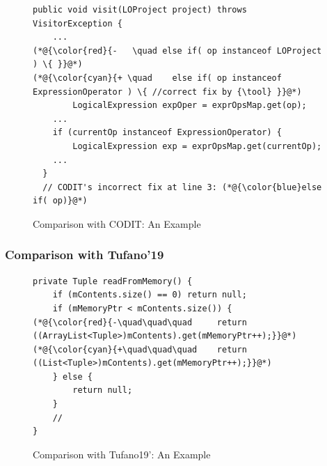 
\begin{figure}[t]
	\centering
	\begin{lstlisting}[]
public void visit(LOProject project) throws VisitorException {
    ...
(*@{\color{red}{-	\quad else if( op instanceof LOProject ) \{ }}@*)
(*@{\color{cyan}{+ \quad	else if( op instanceof ExpressionOperator ) \{ //correct fix by {\tool} }}@*)
		LogicalExpression expOper = exprOpsMap.get(op);
	...
	if (currentOp instanceof ExpressionOperator) {
		LogicalExpression exp = exprOpsMap.get(currentOp);
	...
  }
  // CODIT's incorrect fix at line 3: (*@{\color{blue}else if( op)}@*) 
	\end{lstlisting}
        \vspace{-17pt}
	\caption{Comparison with CODIT: An Example}
	\label{example_codit}
\end{figure}

\subsubsection{\bf Comparison with Tufano'19}



\begin{figure}[t]
	\centering
	\begin{lstlisting}[]
private Tuple readFromMemory() {
    if (mContents.size() == 0) return null;
    if (mMemoryPtr < mContents.size()) {
(*@{\color{red}{-\quad\quad\quad     return ((ArrayList<Tuple>)mContents).get(mMemoryPtr++);}}@*)
(*@{\color{cyan}{+\quad\quad\quad    return ((List<Tuple>)mContents).get(mMemoryPtr++);}}@*)
	} else {
        return null;
    }
    // 
}
	\end{lstlisting}
        \vspace{-15pt}
	\caption{Comparison with Tufano19': An Example}
	\label{example_tufano19}
\end{figure}

